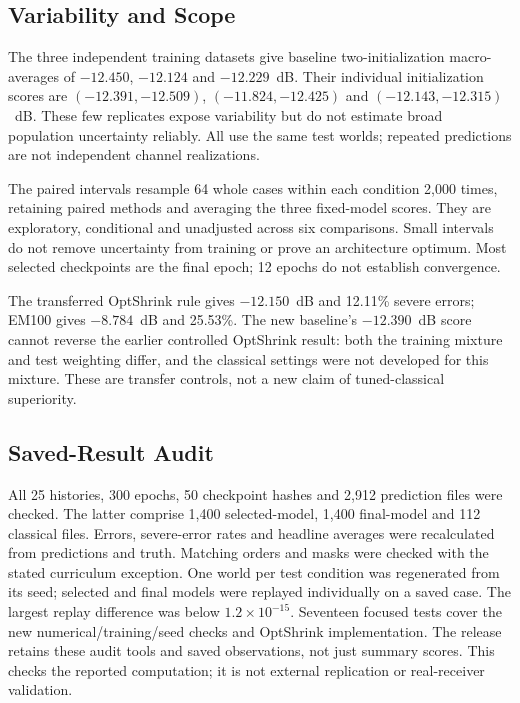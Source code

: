 \subsection{Variability and Scope}
The three independent training datasets give baseline two-initialization
macro-averages of $-12.450$, $-12.124$ and $-12.229$~dB. Their individual
initialization scores are $(-12.391,-12.509)$, $(-11.824,-12.425)$ and
$(-12.143,-12.315)$~dB. These few replicates expose variability but do not
estimate broad population uncertainty reliably. All use the same test
worlds; repeated predictions are not independent channel realizations.

The paired intervals resample 64 whole cases within each condition 2,000
times, retaining paired methods and averaging the three fixed-model scores.
They are exploratory, conditional and unadjusted across six comparisons.
Small intervals do not remove uncertainty from training or prove an
architecture optimum. Most selected checkpoints are the final epoch;
12 epochs do not establish convergence.

The transferred OptShrink rule gives $-12.150$~dB and 12.11\% severe
errors; EM100 gives $-8.784$~dB and 25.53\%. The new baseline's
$-12.390$~dB score cannot reverse the earlier controlled OptShrink result:
both the training mixture and test weighting differ, and the classical
settings were not developed for this mixture. These are transfer controls,
not a new claim of tuned-classical superiority.

\subsection{Saved-Result Audit}
All 25 histories, 300 epochs, 50 checkpoint hashes and 2,912 prediction
files were checked. The latter comprise 1,400 selected-model, 1,400
final-model and 112 classical files. Errors, severe-error rates and
headline averages were recalculated from predictions and truth. Matching
orders and masks were checked with the stated curriculum exception.
One world per test condition was regenerated from its seed; selected
and final models were replayed individually on a saved case. The largest
replay difference was below $1.2\times10^{-15}$. Seventeen focused tests
cover the new numerical/training/seed checks and OptShrink implementation.
The release retains these audit tools and saved observations, not just
summary scores. This checks the reported computation; it is not external
replication or real-receiver validation.
